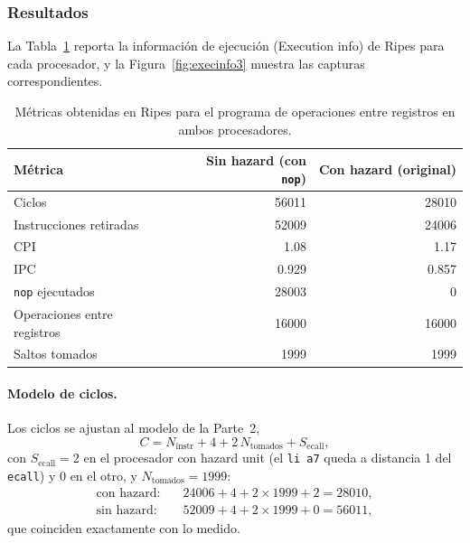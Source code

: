\documentclass[11pt,a4paper]{article}
\begin{document}
\subsubsection{Resultados}
\label{sec:resultados3}

La Tabla~\ref{tab:resultados3} reporta la informaci\'on de ejecuci\'on (Execution
info) de Ripes para cada procesador, y la Figura~\ref{fig:execinfo3} muestra las
capturas correspondientes.

\begin{table}[h]
  \centering
  \begin{tabular}{@{}lrr@{}}
    \toprule
    M\'etrica & Sin hazard (con \texttt{nop}) & Con hazard (original) \\
    \midrule
    Ciclos                          & 56011  & 28010  \\
    Instrucciones retiradas         & 52009  & 24006  \\
    CPI                             & 1.08   & 1.17   \\
    IPC                             & 0.929  & 0.857  \\
    \texttt{nop} ejecutados         & 28003  & 0      \\
    Operaciones entre registros     & 16000  & 16000  \\
    Saltos tomados                  & 1999   & 1999   \\
    \bottomrule
  \end{tabular}
  \caption{M\'etricas obtenidas en Ripes para el programa de operaciones entre registros en ambos procesadores.}
  \label{tab:resultados3}
\end{table}

\paragraph{Modelo de ciclos.}
Los ciclos se ajustan al modelo de la Parte~2,
\begin{equation}
  C = N_{\text{instr}} + 4 + 2\,N_{\text{tomados}} + S_{\text{ecall}} ,
\end{equation}
con $S_{\text{ecall}} = 2$ en el procesador con hazard unit (el \texttt{li a7}
queda a distancia 1 del \texttt{ecall}) y $0$ en el otro, y $N_{\text{tomados}} = 1999$:
\begin{align}
  \text{con hazard:} &\quad 24006 + 4 + 2 \times 1999 + 2 = 28010, \\
  \text{sin hazard:} &\quad 52009 + 4 + 2 \times 1999 + 0 = 56011 ,
\end{align}
que coinciden exactamente con lo medido.
\end{document}
